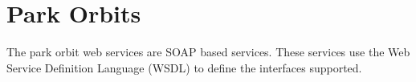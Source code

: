 \documentclass[letterpaper,10pt,english]{sphinxmanual}
\begin{document}
\section{Park Orbits}
\label{\detokenize{soapapi:park-orbits}}
The park orbit web services are SOAP based services. These services use the Web Service Definition Language (WSDL) to define the interfaces supported.


\begin{sphinxVerbatim}[commandchars=\\\{\}]
\end{sphinxVerbatim}

\end{document}
